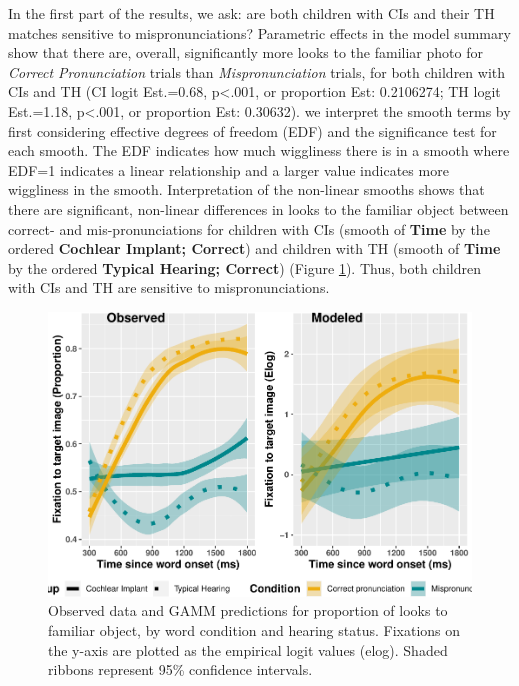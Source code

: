 \documentclass[
]{article}
\begin{document}
In the first part of the results, we ask: are both children with CIs and their TH matches sensitive to mispronunciations? Parametric effects in the model summary show that there are, overall, significantly more looks to the familiar photo for \emph{Correct Pronunciation} trials than \emph{Mispronunciation} trials, for both children with CIs and TH (CI logit Est.=0.68, p\textless.001, or proportion Est: 0.2106274; TH logit Est.=1.18, p\textless.001, or proportion Est: 0.30632). we interpret the smooth terms by first considering effective degrees of freedom (EDF) and the significance test for each smooth. The EDF indicates how much wiggliness there is in a smooth where EDF=1 indicates a linear relationship and a larger value indicates more wiggliness in the smooth. Interpretation of the non-linear smooths shows that there are significant, non-linear differences in looks to the familiar object between correct- and mis-pronunciations for children with CIs (smooth of \textbf{Time} by the ordered \textbf{Cochlear Implant; Correct}) and children with TH (smooth of \textbf{Time} by the ordered \textbf{Typical Hearing; Correct}) (Figure \ref{fig:2x2-plot}). Thus, both children with CIs and TH are sensitive to mispronunciations.

\begin{figure}
\centering
\includegraphics{2_modeling_files/figure-latex/2x2-plot-1.pdf}
\caption{\label{fig:2x2-plot}Observed data and GAMM predictions for proportion of looks to familiar object, by word condition and hearing status. Fixations on the y-axis are plotted as the empirical logit values (elog). Shaded ribbons represent 95\% confidence intervals.}
\end{figure}
\end{document}
